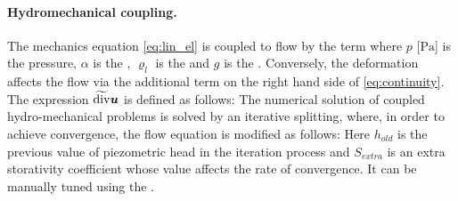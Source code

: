 \paragraph{Hydromechanical coupling.}
The mechanics equation \eqref{eq:lin_el} is coupled to flow by the term
where $p$ [$\mathrm{Pa}$] is the pressure, $\alpha$ \units{}{}{} is the , $\varrho_l$  is the  and $g$  is the .
Conversely, the deformation affects the flow via the additional term
on the right hand side of \eqref{eq:continuity}.
The expression $\widetilde{\operatorname{div}}\mathbf{\boldsymbol{u}}$ is defined as follows:
The numerical solution of coupled hydro-mechanical problems is solved by an iterative splitting, where, in order to achieve convergence, the flow equation is modified as follows:
Here $h_{old}$ is the previous value of piezometric head in the iteration process and $S_{extra}$ is an extra storativity coefficient whose value affects the rate of convergence.
It can be manually tuned using the .


